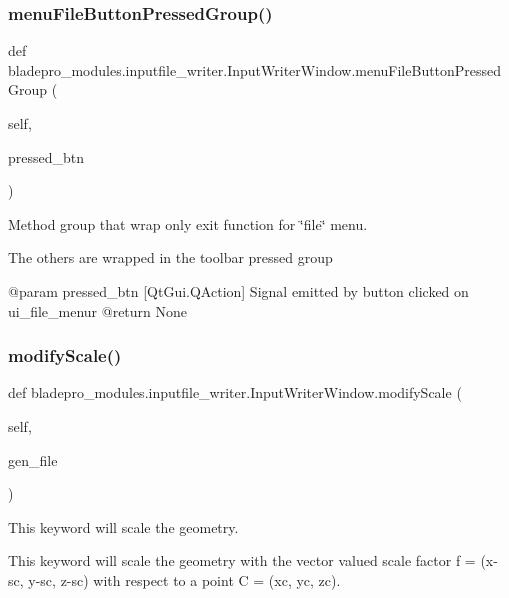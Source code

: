 \subsubsection{\texorpdfstring{menu\+File\+Button\+Pressed\+Group()}{menuFileButtonPressedGroup()}}
{\footnotesize\ttfamily def bladepro\+\_\+modules.\+inputfile\+\_\+writer.\+Input\+Writer\+Window.\+menu\+File\+Button\+Pressed\+Group (\begin{DoxyParamCaption}\item[{}]{self,  }\item[{}]{pressed\+\_\+btn }\end{DoxyParamCaption})}



Method group that wrap only exit function for \char`\"{}file\char`\"{} menu. 

The others are wrapped in the toolbar pressed group \begin{DoxyVerb}   @param pressed_btn [QtGui.QAction] Signal emitted by button clicked on ui_file_menur
   @return None\end{DoxyVerb}
 \hypertarget{a00073_aa1bef88b3d57a567e44548155e7ec02f}{}\label{a00073_aa1bef88b3d57a567e44548155e7ec02f} 
\subsubsection{\texorpdfstring{modify\+Scale()}{modifyScale()}}
{\footnotesize\ttfamily def bladepro\+\_\+modules.\+inputfile\+\_\+writer.\+Input\+Writer\+Window.\+modify\+Scale (\begin{DoxyParamCaption}\item[{}]{self,  }\item[{}]{gen\+\_\+file }\end{DoxyParamCaption})}



This keyword will scale the geometry. 

This keyword will scale the geometry with the vector valued scale factor f = (x-\/sc, y-\/sc, z-\/sc) with respect to a point C = (xc, yc, zc).


